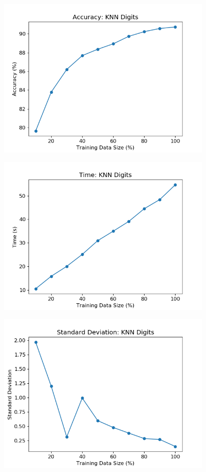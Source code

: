 \documentclass{article}
\begin{document}
\includegraphics[width=0.8\textwidth,height=0.8\textheight,keepaspectratio]{k_d.png}

\includegraphics[width=0.8\textwidth,height=0.8\textheight,keepaspectratio]{k_d-t.png}

\includegraphics[width=0.8\textwidth,height=0.8\textheight,keepaspectratio]{std_kd.png}
\end{document}
